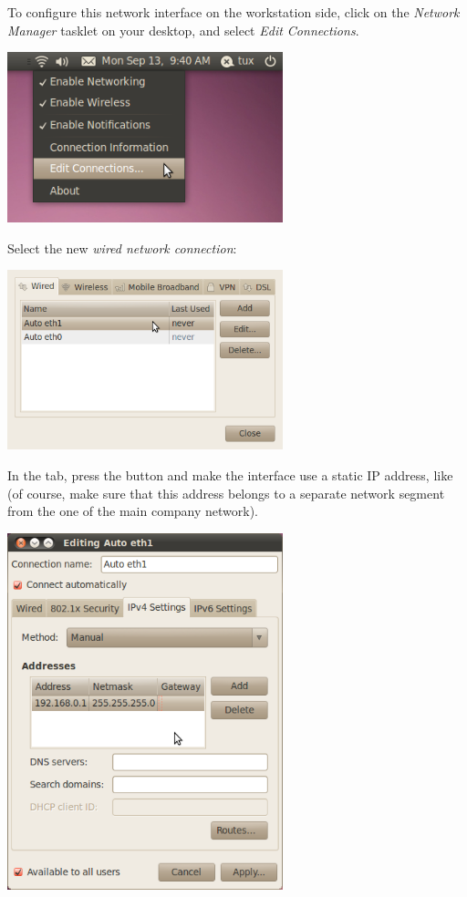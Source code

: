 To configure this network interface on the workstation side, click on
the {\em Network Manager} tasklet on your desktop, and select {\em
Edit Connections}.

\begin{center}
\includegraphics[width=8cm]{labs/buildroot-rootfs/network-config-1.png}
\end{center}

Select the new {\em wired network connection}:

\begin{center}
\includegraphics[width=8cm]{labs/buildroot-rootfs/network-config-2.png}
\end{center}

In the  tab, press the  button
and make the interface use a static IP
address, like  (of course, make sure that this
address belongs to a separate network segment from the one of the main
company network).

\begin{center}
\includegraphics[width=8cm]{labs/buildroot-rootfs/network-config-3.png}
\end{center}

